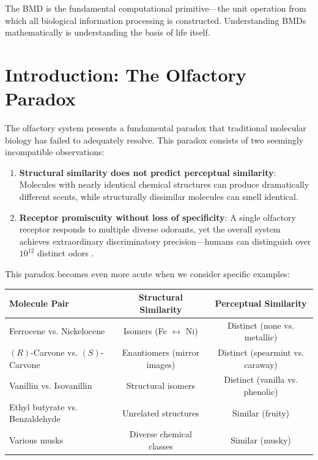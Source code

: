 \documentclass[12pt,a4paper]{article}
\begin{document}
The BMD is the fundamental computational primitive—the unit operation from which all biological information processing is constructed. Understanding BMDs mathematically is understanding the basis of life itself.

\section{Introduction: The Olfactory Paradox}

The olfactory system presents a fundamental paradox that traditional molecular biology has failed to adequately resolve. This paradox consists of two seemingly incompatible observations:

\begin{enumerate}
\item \textbf{Structural similarity does not predict perceptual similarity}: Molecules with nearly identical chemical structures can produce dramatically different scents, while structurally dissimilar molecules can smell identical.

\item \textbf{Receptor promiscuity without loss of specificity}: A single olfactory receptor responds to multiple diverse odorants, yet the overall system achieves extraordinary discriminatory precision—humans can distinguish over $10^{12}$ distinct odors \cite{bushdid2014humans}.
\end{enumerate}

This paradox becomes even more acute when we consider specific examples:

\begin{center}
\begin{tabular}{lcc}
\toprule
\textbf{Molecule Pair} & \textbf{Structural Similarity} & \textbf{Perceptual Similarity} \\
\midrule
Ferrocene vs. Nickelocene & Isomers (Fe $\leftrightarrow$ Ni) & Distinct (none vs. metallic) \\
$(R)$-Carvone vs. $(S)$-Carvone & Enantiomers (mirror images) & Distinct (spearmint vs. caraway) \\
Vanillin vs. Isovanillin & Structural isomers & Distinct (vanilla vs. phenolic) \\
\midrule
Ethyl butyrate vs. Benzaldehyde & Unrelated structures & Similar (fruity) \\
Various musks & Diverse chemical classes & Similar (musky) \\
\bottomrule
\end{tabular}
\end{center}
\end{document}
